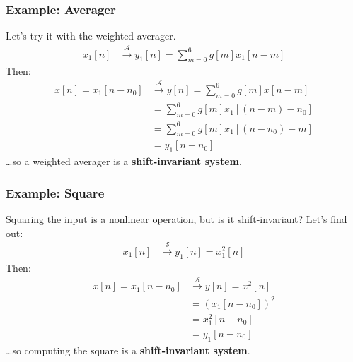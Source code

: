 \documentclass{beamer}
\begin{document}
\begin{frame}
  \frametitle{Example: Averager}

  Let's try it with the weighted averager.
  \begin{align*}
  x_1[n] &\stackrel{\mathcal A}{\longrightarrow} y_1[n]=\sum_{m=0}^6 g[m] x_1[n-m]
  \end{align*}
  Then:
  \begin{align*}
    x[n]=x_1[n-n_0] &\stackrel{\mathcal A}{\longrightarrow} y[n]=\sum_{m=0}^6 g[m] x[n-m]\\
    &=\sum_{m=0}^6 g[m] x_1\left[(n-m)-n_0\right]\\
    &=\sum_{m=0}^6 g[m] x_1\left[(n-n_0)-m\right]\\
    &=y_1[n-n_0]
  \end{align*}
  \ldots so a weighted averager is a {\bf shift-invariant system}.
\end{frame}

\begin{frame}
  \frametitle{Example: Square}

  Squaring the input is a nonlinear operation, but is it shift-invariant?
  Let's find out:
  \begin{align*}
  x_1[n] &\stackrel{\mathcal S}{\longrightarrow} y_1[n]=x_1^2[n]
  \end{align*}
  Then:
  \begin{align*}
    x[n]=x_1[n-n_0] &\stackrel{\mathcal A}{\longrightarrow} y[n]=x^2[n]\\
    &= \left(x_1[n-n_0]\right)^2\\
    &= x_1^2[n-n_0]\\
    &=y_1[n-n_0]
  \end{align*}
  \ldots so computing the square is a {\bf shift-invariant system}.
\end{frame}
\end{document}
